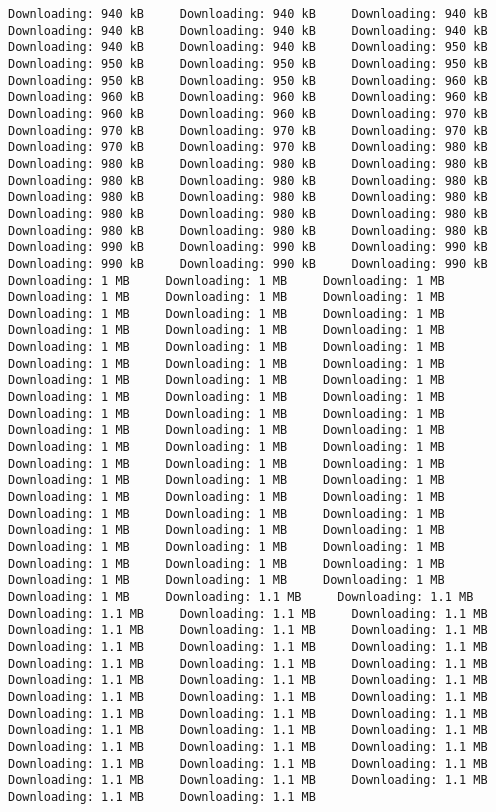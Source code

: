 \documentclass[
  12pt,
  portuguese,
]{report}
\begin{document}
\begin{verbatim}
Downloading: 940 kB     Downloading: 940 kB     Downloading: 940 kB     Downloading: 940 kB     Downloading: 940 kB     Downloading: 940 kB     Downloading: 940 kB     Downloading: 940 kB     Downloading: 950 kB     Downloading: 950 kB     Downloading: 950 kB     Downloading: 950 kB     Downloading: 950 kB     Downloading: 950 kB     Downloading: 960 kB     Downloading: 960 kB     Downloading: 960 kB     Downloading: 960 kB     Downloading: 960 kB     Downloading: 960 kB     Downloading: 970 kB     Downloading: 970 kB     Downloading: 970 kB     Downloading: 970 kB     Downloading: 970 kB     Downloading: 970 kB     Downloading: 980 kB     Downloading: 980 kB     Downloading: 980 kB     Downloading: 980 kB     Downloading: 980 kB     Downloading: 980 kB     Downloading: 980 kB     Downloading: 980 kB     Downloading: 980 kB     Downloading: 980 kB     Downloading: 980 kB     Downloading: 980 kB     Downloading: 980 kB     Downloading: 980 kB     Downloading: 980 kB     Downloading: 980 kB     Downloading: 990 kB     Downloading: 990 kB     Downloading: 990 kB     Downloading: 990 kB     Downloading: 990 kB     Downloading: 990 kB     Downloading: 1 MB     Downloading: 1 MB     Downloading: 1 MB     Downloading: 1 MB     Downloading: 1 MB     Downloading: 1 MB     Downloading: 1 MB     Downloading: 1 MB     Downloading: 1 MB     Downloading: 1 MB     Downloading: 1 MB     Downloading: 1 MB     Downloading: 1 MB     Downloading: 1 MB     Downloading: 1 MB     Downloading: 1 MB     Downloading: 1 MB     Downloading: 1 MB     Downloading: 1 MB     Downloading: 1 MB     Downloading: 1 MB     Downloading: 1 MB     Downloading: 1 MB     Downloading: 1 MB     Downloading: 1 MB     Downloading: 1 MB     Downloading: 1 MB     Downloading: 1 MB     Downloading: 1 MB     Downloading: 1 MB     Downloading: 1 MB     Downloading: 1 MB     Downloading: 1 MB     Downloading: 1 MB     Downloading: 1 MB     Downloading: 1 MB     Downloading: 1 MB     Downloading: 1 MB     Downloading: 1 MB     Downloading: 1 MB     Downloading: 1 MB     Downloading: 1 MB     Downloading: 1 MB     Downloading: 1 MB     Downloading: 1 MB     Downloading: 1 MB     Downloading: 1 MB     Downloading: 1 MB     Downloading: 1 MB     Downloading: 1 MB     Downloading: 1 MB     Downloading: 1 MB     Downloading: 1 MB     Downloading: 1 MB     Downloading: 1 MB     Downloading: 1 MB     Downloading: 1 MB     Downloading: 1 MB     Downloading: 1.1 MB     Downloading: 1.1 MB     Downloading: 1.1 MB     Downloading: 1.1 MB     Downloading: 1.1 MB     Downloading: 1.1 MB     Downloading: 1.1 MB     Downloading: 1.1 MB     Downloading: 1.1 MB     Downloading: 1.1 MB     Downloading: 1.1 MB     Downloading: 1.1 MB     Downloading: 1.1 MB     Downloading: 1.1 MB     Downloading: 1.1 MB     Downloading: 1.1 MB     Downloading: 1.1 MB     Downloading: 1.1 MB     Downloading: 1.1 MB     Downloading: 1.1 MB     Downloading: 1.1 MB     Downloading: 1.1 MB     Downloading: 1.1 MB     Downloading: 1.1 MB     Downloading: 1.1 MB     Downloading: 1.1 MB     Downloading: 1.1 MB     Downloading: 1.1 MB     Downloading: 1.1 MB     Downloading: 1.1 MB     Downloading: 1.1 MB     Downloading: 1.1 MB     Downloading: 1.1 MB     Downloading: 1.1 MB     Downloading: 1.1 MB     Downloading: 1.1 MB     Downloading: 1.1 MB     
\end{verbatim}
\end{document}
